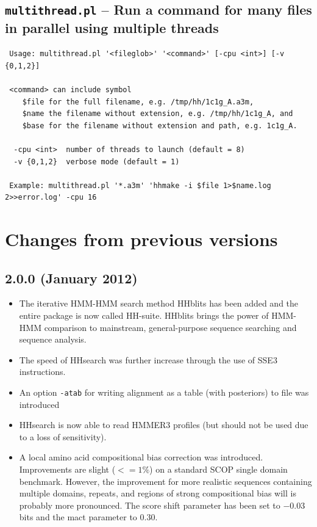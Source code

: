 \documentclass[11pt,a4paper]{article}
\begin{document}
\subsection{{\tt multithread.pl} -- Run a command for many files in parallel using multiple threads}

\small 
\begin{verbatim}
 Usage: multithread.pl '<fileglob>' '<command>' [-cpu <int>] [-v {0,1,2}]

 <command> can include symbol 
    $file for the full filename, e.g. /tmp/hh/1c1g_A.a3m, 
    $name the filename without extension, e.g. /tmp/hh/1c1g_A, and 
    $base for the filename without extension and path, e.g. 1c1g_A.

  -cpu <int>  number of threads to launch (default = 8)
  -v {0,1,2}  verbose mode (default = 1)

 Example: multithread.pl '*.a3m' 'hhmake -i $file 1>$name.log 2>>error.log' -cpu 16
\end{verbatim} 
\normalsize



\section{Changes from previous versions}

\subsection{2.0.0 (January 2012)}

\begin{itemize}

\item The iterative HMM-HMM search method HHblits has been added and the entire package is now called HH-suite. HHblits brings the power of HMM-HMM comparison to mainstream, general-purpose sequence searching and sequence analysis. 

\item The speed of HHsearch was further increase through the use of SSE3 instructions.

\item An option \verb`-atab` for writing alignment as a table (with posteriors) to file was introduced

\item HHsearch is now able to read HMMER3 profiles (but should not be used due to a loss of sensitivity).

\item A local amino acid compositional bias correction was introduced. Improvements are slight ($<=1 \%$) on a standard SCOP single domain benchmark. However, the improvement for more realistic sequences containing multiple domains, repeats, and regions of strong compositional bias will is probably more pronounced. The score shift parameter has been set to $-0.03$ bits and the mact parameter to $0.30$. 

\end{itemize}
\end{document}
